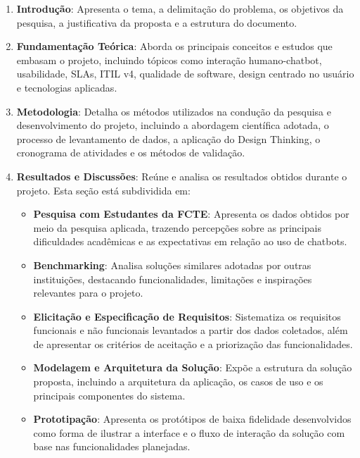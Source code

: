 \begin{enumerate}
    \item \textbf{Introdução}: Apresenta o tema, a delimitação do problema, os objetivos da pesquisa, a justificativa da proposta e a estrutura do documento.

    \item \textbf{Fundamentação Teórica}: Aborda os principais conceitos e estudos que embasam o projeto, incluindo tópicos como interação humano-chatbot, usabilidade, SLAs, ITIL v4, qualidade de software, design centrado no usuário e tecnologias aplicadas.

    \item \textbf{Metodologia}: Detalha os métodos utilizados na condução da pesquisa e desenvolvimento do projeto, incluindo a abordagem científica adotada, o processo de levantamento de dados, a aplicação do Design Thinking, o cronograma de atividades e os métodos de validação.

    \item \textbf{Resultados e Discussões}: Reúne e analisa os resultados obtidos durante o projeto. Esta seção está subdividida em:

    \begin{itemize}
        \item \textbf{Pesquisa com Estudantes da FCTE}: Apresenta os dados obtidos por meio da pesquisa aplicada, trazendo percepções sobre as principais dificuldades acadêmicas e as expectativas em relação ao uso de chatbots.
        
        \item \textbf{Benchmarking}: Analisa soluções similares adotadas por outras instituições, destacando funcionalidades, limitações e inspirações relevantes para o projeto.
        
        \item \textbf{Elicitação e Especificação de Requisitos}: Sistematiza os requisitos funcionais e não funcionais levantados a partir dos dados coletados, além de apresentar os critérios de aceitação e a priorização das funcionalidades.
        
        \item \textbf{Modelagem e Arquitetura da Solução}: Expõe a estrutura da solução proposta, incluindo a arquitetura da aplicação, os casos de uso e os principais componentes do sistema.
        
        \item \textbf{Prototipação}: Apresenta os protótipos de baixa fidelidade desenvolvidos como forma de ilustrar a interface e o fluxo de interação da solução com base nas funcionalidades planejadas.
    \end{itemize}
\end{enumerate}